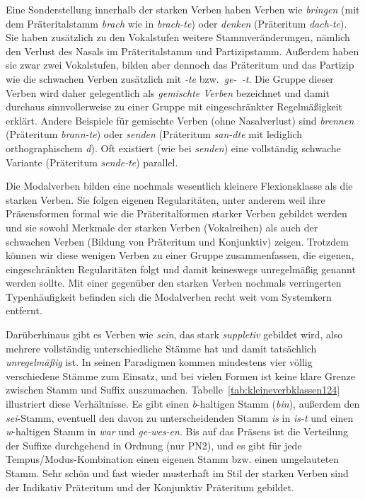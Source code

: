 Eine Sonderstellung innerhalb der starken Verben haben Verben wie \textit{bringen} (mit dem Präteritalstamm \textit{brach} wie in \textit{brach-te}) oder \textit{denken} (Präteritum \textit{dach-te}).
Sie haben zusätzlich zu den Vokalstufen weitere Stammveränderungen, nämlich den Verlust des Nasals im Präteritalstamm und Partizipstamm.
Außerdem haben sie zwar zwei Vokalstufen, bilden aber dennoch das Präteritum und das Partizip wie die schwachen Verben zusätzlich mit \textit{-te} bzw.\ \textit{ge-~-t}.
Die Gruppe dieser Verben wird daher gelegentlich als \textit{gemischte Verben} bezeichnet und damit durchaus sinnvollerweise zu einer Gruppe mit eingeschränkter Regelmäßigkeit erklärt.
Andere Beispiele für gemischte Verben (ohne Nasalverlust) sind \textit{brennen} (Präteritum \textit{brann-te}) oder \textit{senden} (Präteritum \textit{san-dte} mit lediglich orthographischem \textit{d}).
Oft existiert (wie bei \textit{senden}) eine vollständig schwache Variante (Präteritum \textit{sende-te}) parallel.

Die Modalverben bilden eine nochmals wesentlich kleinere Flexionsklasse als die starken Verben.
Sie folgen eigenen Regularitäten, unter anderem weil ihre Präsensformen formal wie die Präteritalformen starker Verben gebildet werden und sie sowohl Merkmale der starken Verben (Vokalreihen) als auch der schwachen Verben (Bildung von Präteritum und Konjunktiv) zeigen.
Trotzdem können wir diese wenigen Verben zu einer Gruppe zusammenfassen, die eigenen, eingeschränkten Regularitäten folgt und damit keineswegs unregelmäßig genannt werden sollte.
Mit einer gegenüber den starken Verben nochmals verringerten Typenhäufigkeit befinden sich die Modalverben recht weit vom Systemkern entfernt.

Darüberhinaus gibt es Verben wie \textit{sein}, das stark \textit{suppletiv} gebildet wird, also mehrere vollständig unterschiedliche Stämme hat und damit tatsächlich \textit{unregelmäßig} ist.\label{abs:kleineverbklassen123}
In seinen Paradigmen kommen mindestens vier völlig verschiedene Stämme zum Einsatz, und bei vielen Formen ist keine klare Grenze zwischen Stamm und Suffix auszumachen.
Tabelle~\ref{tab:kleineverbklassen124} illustriert diese Verhältnisse.
Es gibt einen \textit{b}-haltigen Stamm (\textit{bin}), außerdem den \textit{sei}-Stamm, eventuell den davon zu unterscheidenden Stamm \textit{is} in \textit{is-t} und einen \textit{w}-haltigen Stamm in \textit{war} und \textit{ge-wes-en}.
Bis auf das Präsens ist die Verteilung der Suffixe durchgehend in Ordnung (nur PN2), und es gibt für jede Tempus\slash Modus-Kombination einen eigenen Stamm bzw. einen umgelauteten Stamm.
Sehr schön und fast wieder musterhaft im Stil der starken Verben sind der Indikativ Präteritum und der Konjunktiv Präteritum gebildet.

